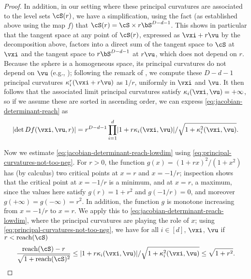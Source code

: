 \documentclass[../../book-main.tex]{subfiles}
\begin{document}
\begin{proof}
    In addition, in our setting where these principal curvatures are associated to the level
    sets $\cS(r)$, we have a simplification, using the fact (as
    established above using the map $f$) that $\cS(r) = \cS \times r\bS^{D-d-1}$.
    This shows in particular that the tangent space at any point of $\cS(r)$,
    expressed as $\vxi + r \vu$ by the decomposition above,
    factors into a direct sum of the tangent space to $\cS$ at $\vxi$ and the
    tangent space to $r\bS^{D-d-1}$ at $r \vu$, which does not depend on $r$.
    Because the sphere is a homogeneous space, its principal curvatures do not
    depend on $\vu$ (e.g., \cite{Lee2018-xb}); following the remark of
    \textcite[\S 1]{Zahle1986-cp}, we compute these $D-d-1$ principal curvatures
    $\kappa_i^r(\vxi + r \vu)$ as $1/r$, uniformly in $\vxi$ and $\vu$. It then
    follows that the associated limit principal curvatures satisfy
    $\kappa_i(\vxi, \vu) = +\infty$, so if we assume these are sorted in
    ascending order, we can express \eqref{eq:jacobian-determinant-reach}
    as
    \begin{equation}\label{eq:jacobian-determinant-reach-lowdim}
        \abs{ \det Df(\vxi, \vu, r)}
        =
        r^{D-d-1}
        \prod_{i=1}^{d}
        \abs{1+r\kappa_i(\vxi,\vu)}/\sqrt{1+\kappa_i^2(\vxi,\vu)}.
    \end{equation}

    Now we estimate \eqref{eq:jacobian-determinant-reach-lowdim} using
    \eqref{eq:principal-curvatures-not-too-neg}.
    For $r>0$, the function $g(x) = (1 + rx)^2 / (1 + x^2)$ has (by calculus)
    two critical points at $x=r$ and $x=-1/r$; inspection shows that the
    critical point at $x=-1/r$ is a minimum, and at $x=r$, a maximum, since the
    values here satisfy $g(r) = 1 + r^2$ and $g(-1/r) = 0$, and moreover
    $g(+\infty) = g(-\infty) = r^2$.
    In addition, the function $g$ is monotone increasing from $x=-1/r$ to
    $x=r$.
    We apply this to \eqref{eq:jacobian-determinant-reach-lowdim}, where the principal
    curvatures are playing the role of $x$; using
    \eqref{eq:principal-curvatures-not-too-neg}, we have for all $i \in [d]$, $\vxi$,
    $\vu$ if $r < \mathrm{reach}(\cS)$ 
    \begin{equation}
        \frac{{\mathrm{reach}(\cS) - r}}{\sqrt{1 + \mathrm{reach}(\cS)^2}}
        \leq
        \abs{1+r\kappa_i(\vxi,\vu)}/\sqrt{1+\kappa_i^2(\vxi,\vu)}
        \leq
        \sqrt{1 + r^2}.
    \end{equation}


\end{proof}
\end{document}
